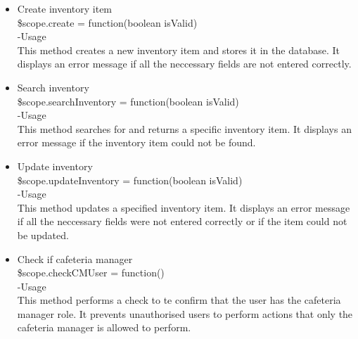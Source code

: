 \documentclass[a4paper,12pt]{article}
\begin{document}
\begin{enumerate}
\begin{itemize}
   \item Create inventory item\\
    \$scope.create = function(boolean isValid)\\
    -Usage\\
    This method creates a new inventory item and stores it in the database. It displays an error message if all the neccessary fields are not entered correctly. 
    \item Search inventory\\
     \$scope.searchInventory = function(boolean isValid)\\
     -Usage\\
     This method searches for and returns a specific inventory item. It displays an error message if the inventory item could not be found.
     \item Update inventory\\
      \$scope.updateInventory = function(boolean isValid)\\
      -Usage\\
      This method updates a specified inventory item. It displays an error message if all the neccessary fields were not entered correctly or if the item could not be updated.
      \item Check if cafeteria manager\\
       \$scope.checkCMUser = function()\\
       -Usage\\
       This method performs a check to te confirm that the user has the cafeteria manager role. It prevents unauthorised users to perform actions that only the cafeteria manager is allowed to perform.
	\end{itemize}
\end{enumerate}
\end{document}
